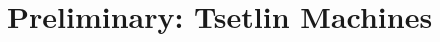 \documentclass[sn-mathphys-num]{sn-jnl}%
\theoremstyle{thmstyleone}%
\theoremstyle{thmstyletwo}%
\theoremstyle{thmstylethree}%
\providecommand{\DIFdelbegin}{} %
\providecommand{\DIFscaledelfig}{0.5}
\newlength{\DIFdelgraphicswidth} %
\newlength{\DIFdelgraphicsheight} %
\providecommand{\DIFdelincludegraphics}[2][]{%
\sbox{\DIFdelgraphicsbox}{\DIFOincludegraphics[#1]{#2}}%
\settoboxwidth{\DIFdelgraphicswidth}{\DIFdelgraphicsbox} %
\settoboxtotalheight{\DIFdelgraphicsheight}{\DIFdelgraphicsbox} %
\scalebox{\DIFscaledelfig}{%
\parbox[b]{\DIFdelgraphicswidth}{\usebox{\DIFdelgraphicsbox}\\[-\baselineskip] \rule{\DIFdelgraphicswidth}{0em}}\llap{\resizebox{\DIFdelgraphicswidth}{\DIFdelgraphicsheight}{%
\setlength{\unitlength}{\DIFdelgraphicswidth}%
\begin{picture}(1,1)%
\thicklines\linethickness{2pt} %
{\color[rgb]{1,0,0}\put(0,0){\framebox(1,1){}}}%
{\color[rgb]{1,0,0}\put(0,0){\line( 1,1){1}}}%
{\color[rgb]{1,0,0}\put(0,1){\line(1,-1){1}}}%
\end{picture}%
}\hspace*{3pt}}} %
} %
\DeclareRobustCommand{\DIFdelbegin}{\DIFOdelbegin \let\includegraphics\DIFdelincludegraphics} %
\begin{document}
\section{Preliminary: Tsetlin Machines}
\DIFdelbegin %





\end{document}
